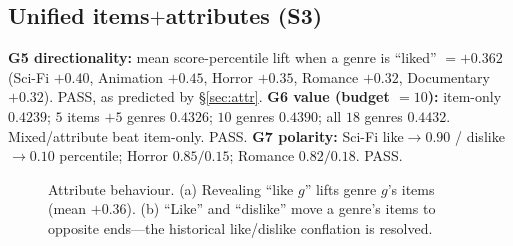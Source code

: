 \documentclass[11pt]{article}
\begin{document}
\subsection{Unified items$+$attributes (S3)}
\textbf{G5 directionality:} mean score-percentile lift when a genre is ``liked'' $=+0.362$ (Sci-Fi $+0.40$,
Animation $+0.45$, Horror $+0.35$, Romance $+0.32$, Documentary $+0.32$). PASS, as predicted by \S\ref{sec:attr}.
\textbf{G6 value (budget $=10$):} item-only $0.4239$; $5$ items $+5$ genres $0.4326$; $10$ genres $0.4390$; all
$18$ genres $0.4432$. Mixed/attribute beat item-only. PASS. \textbf{G7 polarity:} Sci-Fi like$\to0.90$ /
dislike$\to0.10$ percentile; Horror $0.85/0.15$; Romance $0.82/0.18$. PASS.

\begin{figure}[h]\centering
\begin{minipage}{0.49\textwidth}\centering
{}
\end{minipage}\hfill
\begin{minipage}{0.49\textwidth}\centering
{}
\end{minipage}
\caption{Attribute behaviour. (a) Revealing ``like $g$'' lifts genre $g$'s items (mean $+0.36$). (b) ``Like'' and
``dislike'' move a genre's items to opposite ends---the historical like/dislike conflation is resolved.}
\label{fig:s3}
\end{figure}
\end{document}

